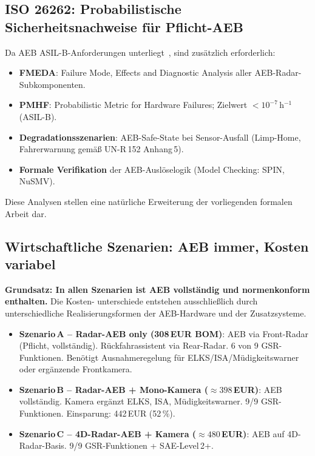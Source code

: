 ﻿\documentclass[a4paper,12pt]{article}
\theoremstyle{definition}
\begin{document}
\subsection{ISO 26262: Probabilistische Sicherheitsnachweise f\"ur Pflicht-AEB}

Da AEB ASIL-B-Anforderungen unterliegt~\cite{iso26262}, sind
zus\"atzlich erforderlich:

\begin{itemize}
  \item \textbf{FMEDA}: Failure Mode, Effects and Diagnostic Analysis
        aller AEB-Radar-Subkompo\-nenten.
  \item \textbf{PMHF}: Probabilistic Metric for Hardware Failures;
        Zielwert $<10^{-7}$\,h$^{-1}$ (ASIL-B).
  \item \textbf{Degradationsszenarien}: AEB-Safe-State bei Sensor-Ausfall
        (Limp-Home, Fahrerwarnung gem\"a\ss{} UN-R\,152 Anhang\,5).
  \item \textbf{Formale Verifikation} der AEB-Ausl\"oselogik
        (Model Checking: SPIN, NuSMV).
\end{itemize}

Diese Analysen stellen eine nat\"urliche Erweiterung der vorliegenden
formalen Arbeit dar.

\subsection{Wirtschaftliche Szenarien: AEB immer, Kosten variabel}

\textcolor{accentred}{\textbf{Grundsatz: In allen Szenarien ist
AEB vollst\"andig und normenkonform enthalten.}} Die Kosten-
unterschiede entstehen ausschlie\ss{}lich durch unterschiedliche
Realisierungsformen der AEB-Hardware und der Zusatzsysteme.

\begin{itemize}
  \item \textbf{Szenario\,A -- Radar-AEB only (308\,EUR BOM)}:
        AEB via Front-Radar (Pflicht, vollst\"andig). R\"uckfahrassistent
        via Rear-Radar. 6 von 9 GSR-Funktionen. Ben\"otigt Ausnahmeregelung
        f\"ur ELKS/ISA/M\"udigkeitswarner oder erg\"anzende Frontkamera.
  \item \textbf{Szenario\,B -- Radar-AEB + Mono-Kamera ($\approx398$\,EUR)}:
        AEB vollst\"andig. Kamera erg\"anzt ELKS, ISA, M\"udigkeitswarner.
        9/9 GSR-Funktionen. Einsparung: 442\,EUR (52\,\%).
  \item \textbf{Szenario\,C -- 4D-Radar-AEB + Kamera ($\approx480$\,EUR)}:
        AEB auf 4D-Radar-Basis. 9/9 GSR-Funktionen + SAE-Level\,2+.
\end{itemize}
\end{document}
